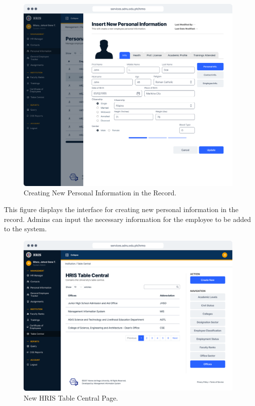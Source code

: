     \begin{figure}[H]
        \centering
        \includegraphics[width=1\linewidth]{figures/app/pi-insert.png}
        \caption{Creating New Personal Information in the Record.}
        \label{fig:app-pi-insert}
    \end{figure}

    This figure displays the interface for creating new personal information in the record. Admins can input the necessary information for the employee to be added to the system.

    \begin{figure}[H]
        \centering
        \includegraphics[width=1\linewidth]{figures/app/table-central.png}
        \caption{New HRIS Table Central Page.}
        \label{fig:app-table-central}
    \end{figure}

